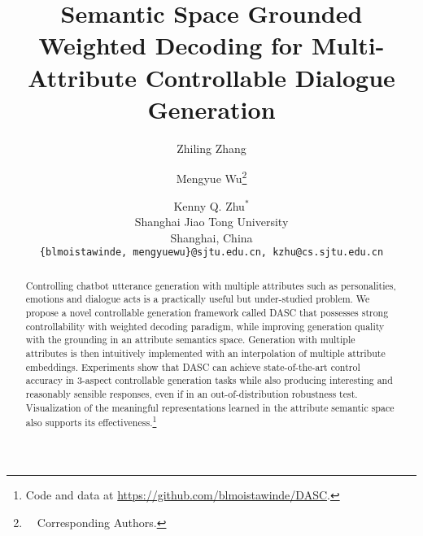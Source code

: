 \documentclass[11pt]{article}
\title{Semantic Space Grounded Weighted Decoding for Multi-Attribute 
Controllable Dialogue Generation}
\author{Zhiling Zhang \and Mengyue Wu\thanks{~~Corresponding Authors. } \and Kenny Q. Zhu$^*$\\
Shanghai Jiao Tong University \\
Shanghai, China\\
\texttt{\{blmoistawinde, mengyuewu\}@sjtu.edu.cn, kzhu@cs.sjtu.edu.cn} }
\begin{document}
\maketitle
\begin{abstract}
Controlling chatbot utterance generation with multiple attributes such as 
personalities, emotions and dialogue acts is a practically useful but 
under-studied problem.
We propose a novel controllable generation framework called DASC 
that possesses strong controllability with weighted decoding paradigm, 
while improving generation quality with the grounding in an 
attribute semantics space. Generation with multiple attributes is then 
intuitively implemented with an interpolation of multiple attribute embeddings. 
Experiments show that DASC can achieve state-of-the-art control accuracy 
in 3-aspect controllable generation tasks while also producing interesting and 
reasonably sensible responses, even if in an out-of-distribution robustness 
test. Visualization of the meaningful representations learned in the 
attribute semantic space also supports its effectiveness.\footnote{Code and data at \url{https://github.com/blmoistawinde/DASC}.}
\end{abstract}








% 





\end{document}
